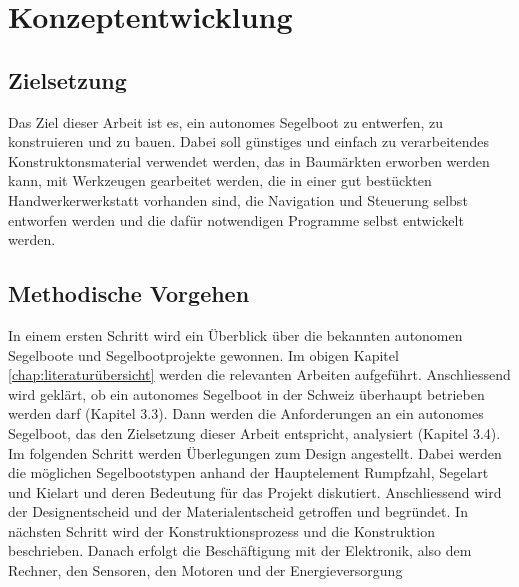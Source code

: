 
\chapter{Konzeptentwicklung }
\label{chap:konzeptentwicklung}
\section{Zielsetzung}
Das Ziel dieser Arbeit ist es, ein autonomes Segelboot zu entwerfen, zu konstruieren und zu bauen. Dabei soll günstiges und einfach zu verarbeitendes Konstruktonsmaterial verwendet werden, das in Baumärkten erworben werden kann, mit Werkzeugen gearbeitet werden, die in einer gut bestückten Handwerkerwerkstatt vorhanden sind, die Navigation und Steuerung selbst entworfen werden und die dafür notwendigen Programme selbst entwickelt werden. 


\section{Methodische Vorgehen}

In einem ersten Schritt wird ein Überblick über die bekannten autonomen Segelboote und Segelbootprojekte gewonnen. Im obigen Kapitel \ref{chap:literaturübersicht} werden die relevanten Arbeiten aufgeführt. Anschliessend wird geklärt, ob ein autonomes Segelboot in der Schweiz überhaupt betrieben werden darf (Kapitel 3.3). Dann werden die Anforderungen an ein autonomes Segelboot, das den Zielsetzung dieser Arbeit entspricht, analysiert (Kapitel 3.4). Im folgenden Schritt werden Überlegungen zum Design angestellt. Dabei werden die möglichen Segelbootstypen anhand der Hauptelement Rumpfzahl, Segelart und Kielart und deren Bedeutung für das Projekt diskutiert. Anschliessend wird der Designentscheid und der Materialentscheid getroffen und begründet. In nächsten Schritt wird der Konstruktionsprozess und die Konstruktion beschrieben. Danach erfolgt die Beschäftigung mit der Elektronik, also dem Rechner, den Sensoren, den Motoren und der Energieversorgung  

